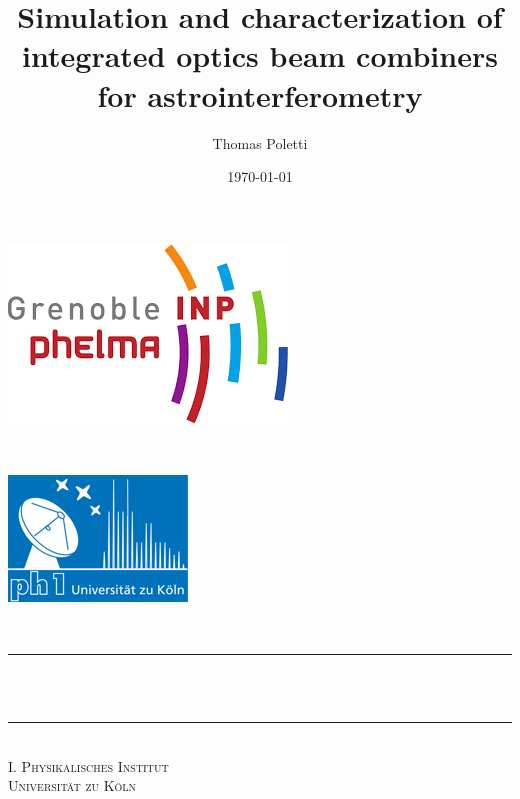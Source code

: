 \documentclass[a4paper,twoside,11pt]{article}
\title{Simulation and characterization of integrated optics beam combiners for astrointerferometry}								%
\author{Thomas Poletti}								%
\date{\today}											%
\makeatletter
\let\thetitle\@title
\makeatother
\begin{document}
\listoftodos

\begin{titlepage}

	\begin{minipage}{0.5\textwidth}
		\begin{flushleft} 
    \includegraphics[scale = 0.6]{phelma.png}\\[1.0 cm]	%
			\end{flushleft}
			\end{minipage}~
			\begin{minipage}{0.5\textwidth}
            
			\begin{flushright} 
    
    \includegraphics[scale = .9]{university.png}\\[1.0 cm]	%
		\end{flushright}
        
	\end{minipage}\\[3 cm]
	
    \centering
    \vspace*{0.5 cm}
	\rule{\linewidth}{0.2 mm} \\[0.4 cm]
	{ \huge \bfseries \thetitle}\\
	\rule{\linewidth}{0.2 mm} \\[1.5 cm]
    \textsc{\Large I. Physikalisches Institut \\
Universität zu Köln}\\[5 cm]	%


\end{titlepage}
\end{document}

